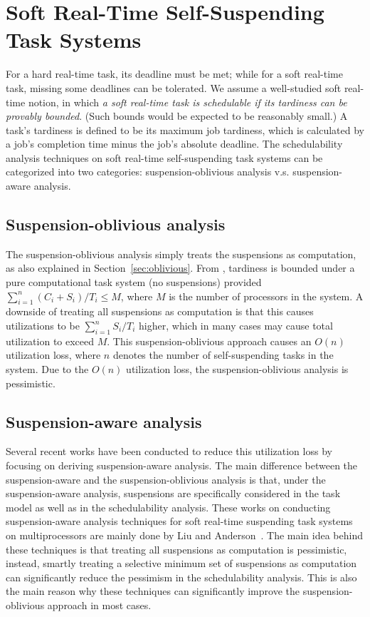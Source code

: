 \section{Soft Real-Time Self-Suspending Task Systems}
\label{sec:soft-realtime}

For a hard real-time task, its deadline must be met; while for a soft real-time task, missing some deadlines can be tolerated. We assume a well-studied soft real-time notion, in which \emph{a soft real-time task is schedulable if its tardiness can be provably bounded}. (Such bounds would be expected to be reasonably small.) A task's tardiness is defined to be its maximum job tardiness, which is calculated by a job's completion time minus the job's absolute deadline.
The schedulability analysis techniques on soft real-time self-suspending task systems can be categorized into two categories: suspension-oblivious analysis v.s. suspension-aware analysis.

\subsection{Suspension-oblivious analysis}
\label{sec:sus-oblivious-soft}

 The suspension-oblivious analysis simply treats the suspensions as computation, as also explained in Section~\ref{sec:oblivious}. From \cite{Devi2005,Leontyev072}, tardiness is bounded under a pure computational task system (no suspensions) provided $\sum_{i=1}^{n} (C_i+S_i)/T_i \leq M$, where $M$ is the number of processors in the system. A downside of treating all suspensions as computation is that this causes utilizations to be $\sum_{i=1}^{n} S_i/T_i$ higher, which in many cases may cause total utilization to exceed $M$.  This suspension-oblivious approach causes an $O(n)$ utilization loss, where $n$ denotes the number of self-suspending tasks in the system. 
 Due to the $O(n)$ utilization loss, the suspension-oblivious analysis is pessimistic. 

\subsection{Suspension-aware analysis}
\label{sec:sus-aware-soft}

Several recent works have been conducted to reduce this utilization loss by focusing on deriving suspension-aware analysis. The main difference between the suspension-aware and the suspension-oblivious analysis is that, under the suspension-aware analysis, suspensions are specifically considered in the task model as well as in the schedulability analysis. These works on conducting suspension-aware analysis techniques for soft real-time suspending task systems on multiprocessors are mainly done by Liu and Anderson~\cite{Liu3,Liu4,Liu5,Liu9,Liu11}. The main idea behind these techniques is that treating all suspensions as computation is pessimistic, instead, smartly treating a selective minimum set of suspensions as computation can significantly reduce the pessimism in the schedulability analysis. This is also the main reason why these techniques can significantly improve the suspension-oblivious approach in most cases.

